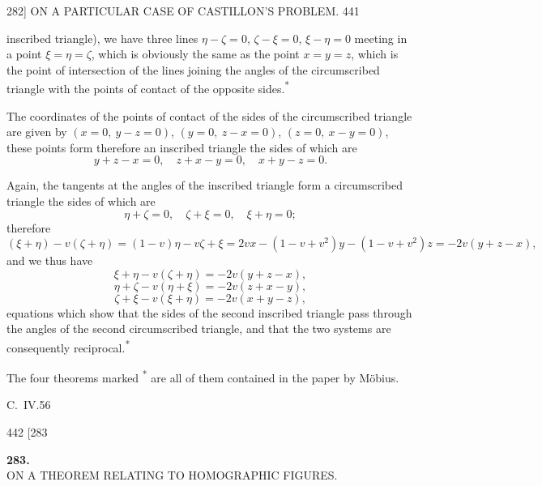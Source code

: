\documentclass[11pt]{article}
\begin{document}
\begin{center}
\textsc{282]} \hfill ON A PARTICULAR CASE OF CASTILLON'S PROBLEM. \hfill 441
\end{center}

inscribed triangle), we have three lines $\eta-\zeta=0$, $\zeta-\xi=0$, $\xi-\eta=0$
meeting in a point $\xi=\eta=\zeta$, which is obviously the same as the point
$x=y=z$, which is the point of intersection of the lines joining the angles of the
circumscribed triangle with the points of contact of the opposite sides.\textsuperscript{*}

The coordinates of the points of contact of the sides of the circumscribed triangle
are given by $(x=0,\ y-z=0)$, $(y=0,\ z-x=0)$, $(z=0,\ x-y=0)$, these points form
therefore an inscribed triangle the sides of which are
\[ y+z-x=0,\quad z+x-y=0,\quad x+y-z=0. \]

Again, the tangents at the angles of the inscribed triangle form a circumscribed
triangle the sides of which are
\[ \eta+\zeta=0,\quad \zeta+\xi=0,\quad \xi+\eta=0; \]
therefore
\[ (\xi+\eta)-v(\zeta+\eta)=(1-v)\eta-v\zeta+\xi=2vx-(1-v+v^{2})y-(1-v+v^{2})z=-2v(y+z-x), \]
and we thus have
\[ \xi+\eta-v(\zeta+\eta)=-2v(y+z-x), \]
\[ \eta+\zeta-v(\eta+\xi)=-2v(z+x-y), \]
\[ \zeta+\xi-v(\xi+\eta)=-2v(x+y-z), \]
equations which show that the sides of the second inscribed triangle pass through the
angles of the second circumscribed triangle, and that the two systems are consequently
reciprocal.\textsuperscript{*}

The four theorems marked \textsuperscript{*} are all of them contained in the paper
by M\"obius.

\medskip
\begin{center}C.\ IV.\hfill 56\end{center}

\begin{center}
442 \hfill \hfill \textsc{[283}
\end{center}

\begin{center}
\textbf{\large 283.}\\[1ex]
\textsc{ON A THEOREM RELATING TO HOMOGRAPHIC FIGURES.}
\end{center}
\end{document}
